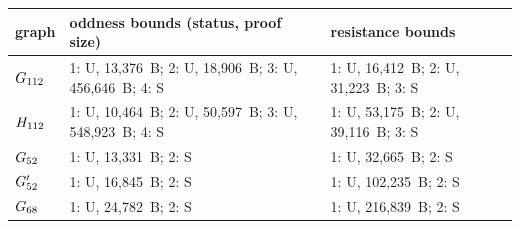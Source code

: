 \begin{tabular}{lp{5.6cm}p{5.0cm}}\toprule
graph & oddness bounds (status, proof size) & resistance bounds\\
\midrule
$G_{112}$ & 1: U, 13{,}376~B; 2: U, 18{,}906~B; 3: U, 456{,}646~B; 4: S & 1: U, 16{,}412~B; 2: U, 31{,}223~B; 3: S\\
$H_{112}$ & 1: U, 10{,}464~B; 2: U, 50{,}597~B; 3: U, 548{,}923~B; 4: S & 1: U, 53{,}175~B; 2: U, 39{,}116~B; 3: S\\
$G_{52}$ & 1: U, 13{,}331~B; 2: S & 1: U, 32{,}665~B; 2: S\\
$G'_{52}$ & 1: U, 16{,}845~B; 2: S & 1: U, 102{,}235~B; 2: S\\
$G_{68}$ & 1: U, 24{,}782~B; 2: S & 1: U, 216{,}839~B; 2: S\\
\bottomrule
\end{tabular}
